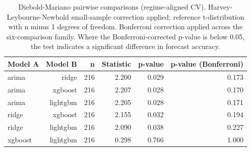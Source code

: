 \begin{table}
\caption{Diebold-Mariano pairwise comparisons (regime-aligned CV). Harvey-Leybourne-Newbold small-sample correction applied; reference t-distribution with n minus 1 degrees of freedom. Bonferroni correction applied across the six-comparison family. Where the Bonferroni-corrected p-value is below 0.05, the test indicates a significant difference in forecast accuracy.}
\begin{tabular}{lrrrrr}
\toprule
Model A & Model B & n & Statistic & p-value & p-value (Bonferroni) \\
\midrule
arima & ridge & 216 & 2.200 & 0.029 & 0.173 \\
arima & xgboost & 216 & 2.207 & 0.028 & 0.170 \\
arima & lightgbm & 216 & 2.205 & 0.028 & 0.171 \\
ridge & xgboost & 216 & 2.155 & 0.032 & 0.194 \\
ridge & lightgbm & 216 & 2.090 & 0.038 & 0.227 \\
xgboost & lightgbm & 216 & 0.298 & 0.766 & 1.000 \\
\bottomrule
\end{tabular}
\end{table}